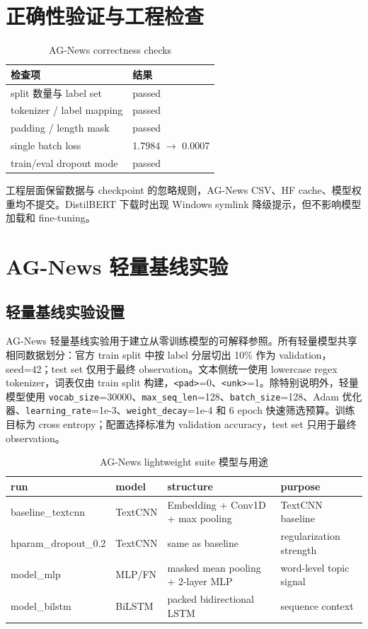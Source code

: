 \documentclass[UTF8,a4paper,11pt]{ctexart}
\begin{document}
\section{正确性验证与工程检查}
\begin{table}[H]
\centering
\caption{AG-News correctness checks}
\begin{tabular}{ll}
\toprule
检查项 & 结果 \\
\midrule
split 数量与 label set & passed \\
tokenizer / label mapping & passed \\
padding / length mask & passed \\
single batch loss & 1.7984 $\rightarrow$ 0.0007 \\
train/eval dropout mode & passed \\
\bottomrule
\end{tabular}
\end{table}

工程层面保留数据与 checkpoint 的忽略规则，AG-News CSV、HF cache、模型权重均不提交。DistilBERT 下载时出现 Windows symlink 降级提示，但不影响模型加载和 fine-tuning。

\section{AG-News 轻量基线实验}
\subsection{轻量基线实验设置}
AG-News 轻量基线实验用于建立从零训练模型的可解释参照。所有轻量模型共享相同数据划分：官方 train split 中按 label 分层切出 10\% 作为 validation，seed=42；test set 仅用于最终 observation。文本侧统一使用 lowercase regex tokenizer，词表仅由 train split 构建，\texttt{<pad>}=0、\texttt{<unk>}=1。除特别说明外，轻量模型使用 \texttt{vocab\_size}=30000、\texttt{max\_seq\_len}=128、\texttt{batch\_size}=128、Adam 优化器、\texttt{learning\_rate}=1e-3、\texttt{weight\_decay}=1e-4 和 6 epoch 快速筛选预算。训练目标为 cross entropy；配置选择标准为 validation accuracy，test set 只用于最终 observation。

\begin{table}[H]
\centering
\caption{AG-News lightweight suite 模型与用途}
\small
\begin{tabular}{llll}
\toprule
run & model & structure & purpose \\
\midrule
baseline\_textcnn & TextCNN & Embedding + Conv1D + max pooling & TextCNN baseline \\
hparam\_dropout\_0.2 & TextCNN & same as baseline & regularization strength \\
model\_mlp & MLP/FN & masked mean pooling + 2-layer MLP & word-level topic signal \\
model\_bilstm & BiLSTM & packed bidirectional LSTM & sequence context \\
\bottomrule
\end{tabular}
\end{table}
\end{document}
